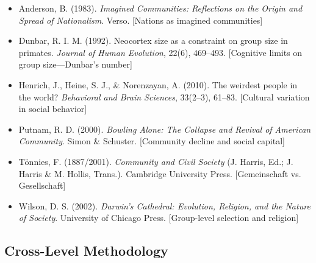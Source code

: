\begin{itemize}

\item Anderson, B. (1983). 
\textit{Imagined Communities: Reflections on the Origin and Spread of Nationalism}. 
Verso.
[Nations as imagined communities]

\item Dunbar, R. I. M. (1992). 
Neocortex size as a constraint on group size in primates. 
\textit{Journal of Human Evolution}, 22(6), 469--493.
[Cognitive limits on group size---Dunbar's number]

\item Henrich, J., Heine, S. J., \& Norenzayan, A. (2010). 
The weirdest people in the world? 
\textit{Behavioral and Brain Sciences}, 33(2--3), 61--83.
[Cultural variation in social behavior]

\item Putnam, R. D. (2000). 
\textit{Bowling Alone: The Collapse and Revival of American Community}. 
Simon \& Schuster.
[Community decline and social capital]

\item Tönnies, F. (1887/2001). 
\textit{Community and Civil Society} (J. Harris, Ed.; J. Harris \& M. Hollis, Trans.). 
Cambridge University Press.
[Gemeinschaft vs. Gesellschaft]

\item Wilson, D. S. (2002). 
\textit{Darwin's Cathedral: Evolution, Religion, and the Nature of Society}. 
University of Chicago Press.
[Group-level selection and religion]

\end{itemize}

\subsection*{Cross-Level Methodology}

